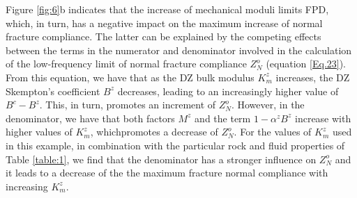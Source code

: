 \documentclass[draft]{agujournal2019}
\begin{document}
Figure \ref{fig:6}b indicates that the increase of mechanical moduli limits FPD, which, in turn, has a negative impact on the maximum increase of normal fracture compliance. The latter can be explained by the competing effects between the terms in the numerator and denominator involved in the calculation of the low-frequency limit of normal fracture compliance $Z_N^o$ (equation \eqref{Eq.23}). From this equation, we have that as the DZ bulk modulus $K_m^z$ increases, the DZ Skempton's coefficient $B^z$ decreases, leading to an increasingly higher value of $B^c-B^z$. This, in turn, promotes an increment of $Z_N^o$. However, in the denominator, we have that both factors  $M^z$ and the term $1-\alpha^z B^z$ increase with higher values of $K_m^z$, whichpromotes a decrease of $Z_N^o$.  For the values of $K_m^z$ used in this example, in combination with the particular rock and fluid properties of Table \ref{table:1}, we find that the denominator has a stronger influence on $Z_N^o$ and it leads to a decrease of the the maximum fracture normal compliance with increasing $K_m^z$. 
\end{document}
